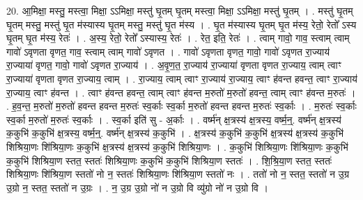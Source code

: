 \documentclass[17pt]{extarticle}
\begin{document}
20. आ॒मिक्षा॒ मस्तु॒ मस्त्वा॒ मिक्षा॒ ऽऽमिक्षा॒ मस्तु॑ घृ॒तम् घृ॒तम् मस्त्वा॒ मिक्षा॒ ऽऽमिक्षा॒ मस्तु॑ घृ॒तम् । . मस्तु॑ घृ॒तम् घृ॒तम् मस्तु॒ मस्तु॑ घृ॒त म॑स्यास्य घृ॒तम् मस्तु॒ मस्तु॑ घृ॒त म॑स्य । . घृ॒त म॑स्यास्य घृ॒तम् घृ॒त म॑स्य॒ रेतो॒ रेतो᳚ ऽस्य घृ॒तम् घृ॒त म॑स्य॒ रेतः॑ । . अ॒स्य॒ रेतो॒ रेतो᳚ ऽस्यास्य॒ रेतः॑ । . रेत॒ इति॒ रेतः॑ । . त्वाम् गावो॒ गाव॒ स्त्वाम् त्वाम् गावो॑ ऽवृणता वृणत॒ गाव॒ स्त्वाम् त्वाम् गावो॑ ऽवृणत । . गावो॑ ऽवृणता वृणत॒ गावो॒ गावो॑ ऽवृणत रा॒ज्याय॑ रा॒ज्याया॑ वृणत॒ गावो॒ गावो॑ ऽवृणत रा॒ज्याय॑ । . अ॒वृ॒ण॒त॒ रा॒ज्याय॑ रा॒ज्याया॑ वृणता वृणत रा॒ज्याय॒ त्वाम् त्वाꣳ रा॒ज्याया॑ वृणता वृणत रा॒ज्याय॒ त्वाम् । . रा॒ज्याय॒ त्वाम् त्वाꣳ रा॒ज्याय॑ रा॒ज्याय॒ त्वाꣳ ह॑वन्त हवन्त॒ त्वाꣳ रा॒ज्याय॑ रा॒ज्याय॒ त्वाꣳ ह॑वन्त । . त्वाꣳ ह॑वन्त हवन्त॒ त्वाम् त्वाꣳ ह॑वन्त म॒रुतो॑ म॒रुतो॑ हवन्त॒ त्वाम् त्वाꣳ ह॑वन्त म॒रुतः॑ । . ह॒व॒न्त॒ म॒रुतो॑ म॒रुतो॑ हवन्त हवन्त म॒रुतः॑ स्व॒र्काः स्व॒र्का म॒रुतो॑ हवन्त हवन्त म॒रुतः॑ स्व॒र्काः । . म॒रुतः॑ स्व॒र्काः स्व॒र्का म॒रुतो॑ म॒रुतः॑ स्व॒र्काः । . स्व॒र्का इति॑ सु - अ॒र्काः । . वर्ष्म॑न् क्ष॒त्रस्य॑ क्ष॒त्रस्य॒ वर्ष्म॒न्॒. वर्ष्म॑न् क्ष॒त्रस्य॑ क॒कुभि॑ क॒कुभि॑ क्ष॒त्रस्य॒ वर्ष्म॒न्॒. वर्ष्म॑न् क्ष॒त्रस्य॑ क॒कुभि॑ । . क्ष॒त्रस्य॑ क॒कुभि॑ क॒कुभि॑ क्ष॒त्रस्य॑ क्ष॒त्रस्य॑ क॒कुभि॑ शिश्रिया॒णः शि॑श्रिया॒णः क॒कुभि॑ क्ष॒त्रस्य॑ क्ष॒त्रस्य॑ क॒कुभि॑ शिश्रिया॒णः । . क॒कुभि॑ शिश्रिया॒णः शि॑श्रिया॒णः क॒कुभि॑ क॒कुभि॑ शिश्रिया॒ण स्तत॒ स्ततः॑ शिश्रिया॒णः क॒कुभि॑ क॒कुभि॑ शिश्रिया॒ण स्ततः॑ । . शि॒श्रि॒या॒ण स्तत॒ स्ततः॑ शिश्रिया॒णः शि॑श्रिया॒ण स्ततो॑ नो न॒ स्ततः॑ शिश्रिया॒णः शि॑श्रिया॒ण स्ततो॑ नः । . ततो॑ नो न॒ स्तत॒ स्ततो॑ न उ॒ग्र उ॒ग्रो न॒ स्तत॒ स्ततो॑ न उ॒ग्रः । . न॒ उ॒ग्र उ॒ग्रो नो॑ न उ॒ग्रो वि व्यु॑ग्रो नो॑ न उ॒ग्रो वि । \newline
\end{document}

